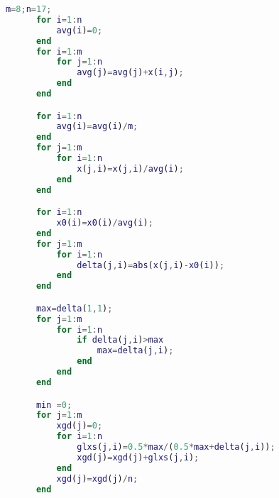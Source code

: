 \begin{lstlisting}[language=MATLAB]
      m=8;n=17;
      for i=1:n
          avg(i)=0;
      end
      for i=1:m
          for j=1:n
              avg(j)=avg(j)+x(i,j);
          end
      end

      for i=1:n
          avg(i)=avg(i)/m;
      end
      for j=1:m
          for i=1:n
              x(j,i)=x(j,i)/avg(i);
          end
      end

      for i=1:n
          x0(i)=x0(i)/avg(i);
      end
      for j=1:m
          for i=1:n
              delta(j,i)=abs(x(j,i)-x0(i));
          end
      end

      max=delta(1,1);
      for j=1:m
          for i=1:n
              if delta(j,i)>max
                  max=delta(j,i);
              end 
          end
      end

      min =0;
      for j=1:m
          xgd(j)=0;
          for i=1:n
              glxs(j,i)=0.5*max/(0.5*max+delta(j,i));
              xgd(j)=xgd(j)+glxs(j,i);
          end
          xgd(j)=xgd(j)/n;
      end
    \end{lstlisting}
